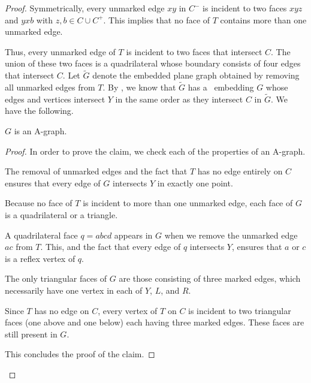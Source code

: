 \begin{proof}
	Symmetrically, every unmarked edge $xy$ in $C^-$ is incident to two faces
	$xyz$ and $yxb$ with $z,b\in C \cup C^+$.  This implies that no face of $T$ contains more than one unmarked edge.
	
	Thus, every unmarked edge of $T$ is incident to two faces that intersect $C$. The union of these two faces is a quadrilateral whose boundary consists of four edges that intersect $C$.
	Let $\tilde{G}$ denote the embedded plane graph obtained by removing all unmarked edges
	from $T$.  By , we know that $\tilde G$ has
	a \Fary\ embedding $G$ whose edges and vertices intersect $Y$ in the
	same order as they intersect $C$ in $\tilde{G}$. We have the following.
	
	\begin{claimx} \label{claim-a-graph}
		$G$ is an A-graph.
	\end{claimx}
	
	\begin{proof}
In order to	prove the claim, we check each of the properties of an A-graph.
	
	\begin{compactenum}
		\item The removal of unmarked edges and the fact that $T$ has no
		edge entirely on $C$ ensures that every edge of $G$ intersects $Y$
		in exactly one point.
		\item Because no face of $T$ is incident to more than one unmarked edge,
		each face of $G$ is a quadrilateral or a triangle.  
		\item A quadrilateral face $q=abcd$ appears in $G$ when we remove the unmarked edge $ac$ from $T$. This, and the fact that every edge of $q$ intersects $Y$, ensures that $a$ or $c$ is a reflex vertex of $q$.
		\item The only triangular faces of $G$ are those consisting
		of three marked edges, which necessarily have one vertex in
		each of $Y$, $L$, and $R$.
		\item Since $T$ has no edge on $C$, every vertex of $T$ on $C$
		is incident to two triangular faces (one above and one below)
		each having three marked edges. These faces are still present in $G$.
	\end{compactenum}
This concludes the proof of the claim.
\end{proof}	


\end{proof}

